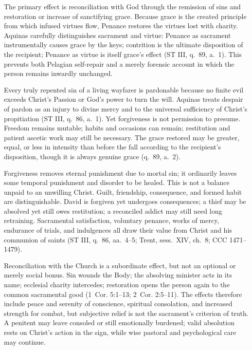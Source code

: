 The primary effect is reconciliation with God through the remission of sins and restoration or increase of sanctifying grace. Because grace is the created principle from which infused virtues flow, Penance restores the virtues lost with charity. Aquinas carefully distinguishes sacrament and virtue: Penance as sacrament instrumentally causes grace by the keys; contrition is the ultimate disposition of the recipient; Penance as virtue is itself grace's effect (ST III, q.~89, a.~1). This prevents both Pelagian self-repair and a merely forensic account in which the person remains inwardly unchanged.

\enlargethispage{\baselineskip}
Every truly repented sin of a living wayfarer is pardonable because no finite evil exceeds Christ's Passion or God's power to turn the will. Aquinas treats despair of pardon as an injury to divine mercy and to the universal sufficiency of Christ's propitiation (ST III, q.~86, a.~1). Yet forgiveness is not permission to presume. Freedom remains mutable; habits and occasions can remain; restitution and patient ascetic work may still be necessary. The grace restored may be greater, equal, or less in intensity than before the fall according to the recipient's disposition, though it is always genuine grace (q.~89, a.~2).

Forgiveness removes eternal punishment due to mortal sin; it ordinarily leaves some temporal punishment and disorder to be healed. This is not a balance unpaid to an unwilling Christ. Guilt, friendship, consequence, and formed habit are distinguishable. David is forgiven yet undergoes consequences; a thief may be absolved yet still owes restitution; a reconciled addict may still need long retraining. Sacramental satisfaction, voluntary penance, works of mercy, endurance of trials, and indulgences all draw their value from Christ and his communion of saints (ST III, q.~86, aa.~4--5; Trent, sess.~XIV, ch.~8; CCC 1471--1479).

Reconciliation with the Church is a subordinate effect, but not an optional or merely social bonus. Sin wounds the Body; the absolving minister acts in its name; ecclesial charity intercedes; restoration opens the person again to the common sacramental good (1~Cor. 5:1--13; 2~Cor. 2:5--11). The effects therefore include peace and serenity of conscience, spiritual consolation, and increased strength for combat, but subjective relief is not the sacrament's criterion of truth. A penitent may leave consoled or still emotionally burdened; valid absolution rests on Christ's action in the sign, while wise pastoral and psychological care may continue.

